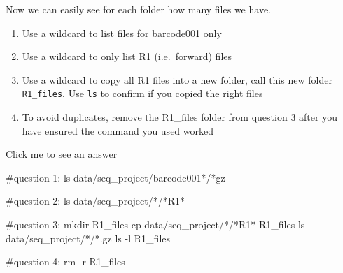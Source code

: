 \documentclass[
  letterpaper,
  DIV=11,
  numbers=noendperiod]{scrreprt}
\newenvironment{Shaded}{}{}
\newcommand{\AttributeTok}[1]{\textcolor[rgb]{0.84,0.23,0.29}{#1}}
\newcommand{\CommentTok}[1]{\textcolor[rgb]{0.42,0.45,0.49}{#1}}
\newcommand{\FunctionTok}[1]{\textcolor[rgb]{0.44,0.26,0.76}{#1}}
\newcommand{\NormalTok}[1]{\textcolor[rgb]{0.14,0.16,0.18}{#1}}
\newcommand{\PreprocessorTok}[1]{\textcolor[rgb]{0.84,0.23,0.29}{#1}}
\providecommand{\tightlist}{%
  \setlength{\itemsep}{0pt}\setlength{\parskip}{0pt}}\usepackage{longtable,booktabs,array}
\begin{document}
Now we can easily see for each folder how many files we have.

\begin{tcolorbox}[enhanced jigsaw, title=\textcolor{quarto-callout-caution-color}{\faFire}\hspace{0.5em}{Exercise}, colframe=quarto-callout-caution-color-frame, opacitybacktitle=0.6, rightrule=.15mm, arc=.35mm, left=2mm, colbacktitle=quarto-callout-caution-color!10!white, bottomrule=.15mm, leftrule=.75mm, toprule=.15mm, opacityback=0, bottomtitle=1mm, colback=white, toptitle=1mm, breakable, titlerule=0mm, coltitle=black]

\begin{enumerate}
\def\labelenumi{\arabic{enumi}.}
\tightlist
\item
  Use a wildcard to list files for barcode001 only
\item
  Use a wildcard to only list R1 (i.e.~forward) files
\item
  Use a wildcard to copy all R1 files into a new folder, call this new
  folder \texttt{R1\_files}. Use \texttt{ls} to confirm if you copied
  the right files
\item
  To avoid duplicates, remove the R1\_files folder from question 3 after
  you have ensured the command you used worked
\end{enumerate}

Click me to see an answer

\begin{Shaded}
\begin{Highlighting}[]
\CommentTok{\#question 1:}
\FunctionTok{ls}\NormalTok{ data/seq\_project/barcode001}\PreprocessorTok{*}\NormalTok{/}\PreprocessorTok{*}\NormalTok{gz}

\CommentTok{\#question 2:}
\FunctionTok{ls}\NormalTok{ data/seq\_project/}\PreprocessorTok{*}\NormalTok{/}\PreprocessorTok{*}\NormalTok{R1}\PreprocessorTok{*}

\CommentTok{\#question 3:}
\FunctionTok{mkdir}\NormalTok{ R1\_files}
\FunctionTok{cp}\NormalTok{ data/seq\_project/}\PreprocessorTok{*}\NormalTok{/}\PreprocessorTok{*}\NormalTok{R1}\PreprocessorTok{*}\NormalTok{ R1\_files}
\FunctionTok{ls}\NormalTok{ data/seq\_project/}\PreprocessorTok{*}\NormalTok{/}\PreprocessorTok{*}\NormalTok{.gz}
\FunctionTok{ls} \AttributeTok{{-}l}\NormalTok{ R1\_files}

\CommentTok{\#question 4:}
\FunctionTok{rm} \AttributeTok{{-}r}\NormalTok{ R1\_files}
\end{Highlighting}
\end{Shaded}


\end{tcolorbox}
\end{document}
